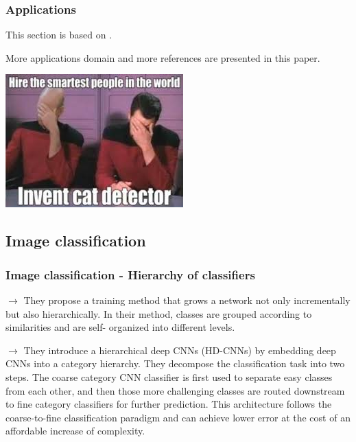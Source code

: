 \begin{frame}
	\frametitle{Applications}
	This section is based on .
	
	\bigskip 
	
	More applications domain and more references are presented in this paper. 
	
	\bigskip
	
	\medskip 
	
	\begin{center}
		\includegraphics[scale=0.6]{figs/cat_detector}
	\end{center}


\end{frame}
\subsection{Image classification}



\begin{frame}
\frametitle{Image classification - Hierarchy of classifiers}






\smallskip
$\rightarrow$ They propose a training method that grows a network not only incrementally but also hierarchically. In their method, classes are grouped according to similarities and are self- organized into different levels. 

\bigskip 



\smallskip
$\rightarrow$ They introduce a hierarchical deep CNNs (HD-CNNs) by embedding deep CNNs into a category hierarchy. They decompose the classification task into two steps. The coarse category CNN classifier is first used to separate easy classes from each other, and then those more challenging classes are routed downstream to fine category classifiers for further prediction. This architecture follows the coarse-to-fine classification paradigm and can achieve lower error at the cost of an affordable increase of complexity.



\end{frame}



